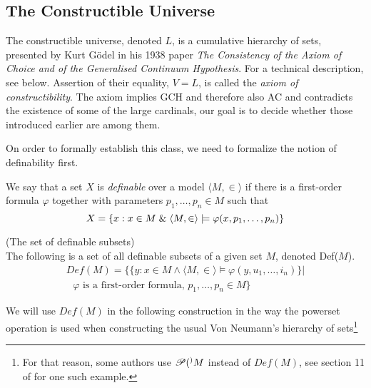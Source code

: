 \subsection{The Constructible Universe} %



The constructible universe, denoted $L$, is a cumulative hierarchy of sets, presented by Kurt Gödel in his 1938 paper \emph{The Consistency of the Axiom of Choice and of the Generalised Continuum Hypothesis}. For a technical description, see below. Assertion of their equality, $V=L$, is called the \emph{axiom of constructibility}. The axiom implies GCH and therefore also AC and contradicts the existence of some of the large cardinals, our goal is to decide whether those introduced earlier are among them.

On order to formally establish this class, we need to formalize the notion of definability first. 
\begin{definition}
We say that a set $X$ is \emph{definable} over a model $\langle M, \in \rangle$ if there is a first-order formula $\varphi$ together with parameters $p_1, \ldots, p_n \in M$ such that
\begin{equation}
X = \{x: x \in M \mathrel{\&} \langle M, \in \rangle \models \varphi(x, p_1, \ldots, p_n)\}
\end{equation}
\end{definition}

\begin{definition}{(The set of definable subsets)}\\
The following is a set of all definable subsets of a given set $M$, denoted Def($M$).
\begin{equation}
\begin{gathered}
Def(M) = \{\{y : x \in M \land \langle M, \in \rangle \models \varphi(y, u_1, \ldots, i_n) \} |\\
\mbox{ $\varphi$ is a~first-order formula, }p_1, \ldots, p_n \in M \}
\end{gathered}
\end{equation}
\end{definition}

We will use $Def(M)$ in the following construction in the way the powerset operation is used when constructing the usual Von Neumann's hierarchy of sets\footnote{For that reason, some authors use $\power^{\*}{M}$ instead of $Def(M)$, see section 11 of \cite{PinterBook} for one such example.}

